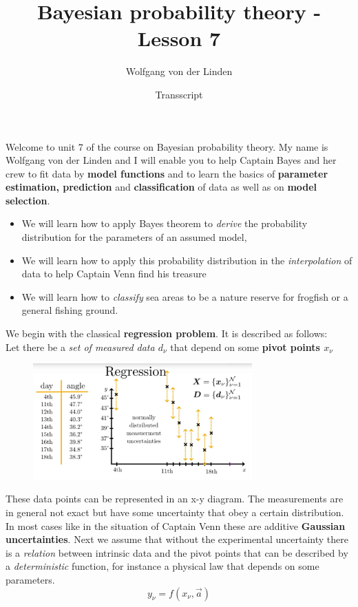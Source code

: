 \documentclass[12pt, a4paper]{scrartcl}
\title{Bayesian probability theory - Lesson 7}
\author{Wolfgang von der Linden}
\date{Transscript}
\begin{document}
\setlength{\parindent}{0pt}
\maketitle
\onehalfspacing

Welcome to unit 7 of the course on Bayesian probability theory. My
name is Wolfgang von der Linden and I will enable you to help Captain
Bayes and her crew to fit data by \textbf{model functions} and to learn the basics of
\textbf{parameter estimation, prediction} and \textbf{classification}
of data as well as on \textbf{model selection}.
\begin{itemize}\item We will learn how to apply Bayes theorem to \textit{derive} the probability
distribution for the parameters of an assumed model,
\item We will learn how to apply this probability distribution in the \textit{interpolation} 
of data to help Captain Venn find his treasure
\item We will learn how to \textit{classify} sea areas to be a nature reserve for
frogfish or a general fishing ground.
\end{itemize}


We begin with the classical \textbf{regression problem}. It is described as follows:\\
Let there be a \textit{set of measured data $d_{\nu}$} that depend on some \textbf{pivot points $x_{\nu}$}%
\begin{figure}[H]
	\centering
	\includegraphics[width=0.75\textwidth]{7_1.png}
\end{figure}
These data points can be represented in an x-y diagram. 
The measurements are in general not exact but have some uncertainty that obey a certain distribution.
In most cases like in the situation of Captain Venn these
are additive \textbf{Gaussian uncertainties}.
Next we assume that without the experimental uncertainty there is a \textit{relation}
between intrinsic data and the pivot points that can be described by a
\textit{deterministic} function, for instance a physical law that depends on some parameters.\\
\[y_{\nu} = f(x_{\nu},\vec{a})\]
\end{document}
